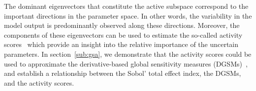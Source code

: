 The dominant eigenvectors that constitute the active subspace correspond to the important directions in the
parameter space. In other words, the variability in the model output is predominantly observed along these
directions. Moreover, the components of these eigenvectors can be used to estimate the so-called 
activity scores~\cite{Diaz:2016,Constantine:2017} which provide an insight into the relative importance
of the uncertain parameters. In 
section~\ref{sub:gsa}, we demonstrate that the activity scores could be used to approximate the 
derivative-based global sensitivity measures (DGSMs)~\cite{Sobol:2009}, and establish a relationship between
the Sobol' total effect index, the DGSMs, and the activity scores.









 




